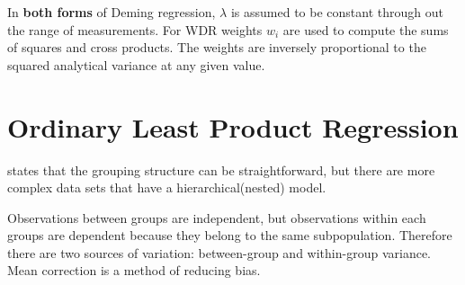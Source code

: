 \documentclass[12pt, a4paper]{report}
\theoremstyle{plain}
\theoremstyle{definition}
\theoremstyle{remark}
\begin{document}
In \textbf{both forms} of Deming regression, $\lambda$ is assumed to be constant through out the range of measurements. For WDR weights $w_{i}$ are used to compute the sums of squares and cross products. The weights are inversely proportional to the squared analytical variance at any given value.






\section{Ordinary Least Product Regression}
\citet{ludbrook97} states that the grouping structure can be
straightforward, but there are more complex data sets that have a hierarchical(nested) model.

Observations between groups are independent, but observations
within each groups are dependent because they belong to the same
subpopulation. Therefore there are two sources of variation:
between-group and within-group variance.
 \vspace{5 mm} \noindent Mean correction is a method of reducing
bias.
\end{document}
